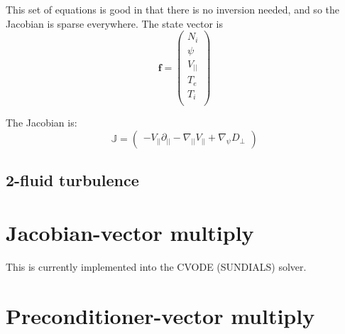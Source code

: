 \documentclass[12pt]{article}
\newcommand{\Vpar}{\ensuremath{V_{||}}}
\newcommand{\Vec}[1]{\ensuremath{\mathbf{#1}}}
\begin{document}
This set of equations is good in that there is no inversion needed,
and so the Jacobian is sparse everywhere. The state vector is
\[
\Vec{f} = \left(\begin{array}{c}
N_i \\
\psi \\
\Vpar \\
T_e \\
T_i \\
\end{array}\right)
\]

The Jacobian is:
\begin{equation}
\mathbb{J} = 
\left( \begin{array}{c|c|c|c}
  -\Vpar\partial_{||} - \nabla_{||}\Vpar + \nabla_\psi D_\perp
\end{array}\right)
\end{equation}

\subsection{2-fluid turbulence}


\section{Jacobian-vector multiply}

This is currently implemented into the CVODE (SUNDIALS) solver.

\section{Preconditioner-vector multiply}
\end{document}
